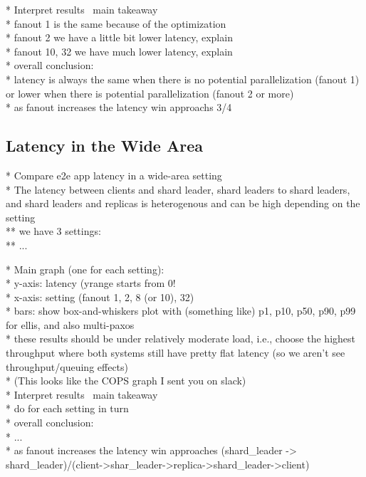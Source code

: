 * Interpret results \ main takeaway\\
* fanout 1 is the same because of the optimization\\
* fanout 2 we have a little bit lower latency, explain\\
* fanout 10, 32 we have much lower latency, explain\\

* overall conclusion:\\
* latency is always the same when there is no potential parallelization (fanout 1) or lower when there is potential parallelization (fanout 2 or more)\\
* as fanout increases the latency win approachs 3/4\\


\subsection{Latency in the Wide Area}
* Compare e2e app latency in a wide-area setting\\
* The latency between clients and shard leader, shard leaders to shard leaders, and shard leaders and replicas is heterogenous and can be high depending on the setting\\
** we have 3 settings:\\
** ...

* Main graph (one for each setting):\\
* y-axis: latency (yrange starts from 0!\\
* x-axis: setting (fanout 1, 2, 8 (or 10), 32)\\
* bars: show box-and-whiskers plot with (something like) p1, p10, p50, p90, p99 for ellis, and also multi-paxos\\
* these results should be under relatively moderate load, i.e., choose the highest throughput where both systems still have pretty flat latency (so we aren't see throughput/queuing effects)\\
* (This looks like the COPS graph I sent you on slack)\\

* Interpret results \ main takeaway\\
* do for each setting in turn\\

* overall conclusion:\\
* ... \\
* as fanout increases the latency win approaches (shard\_leader -> shard\_leader)/(client->shar\_leader->replica->shard\_leader->client)\\

